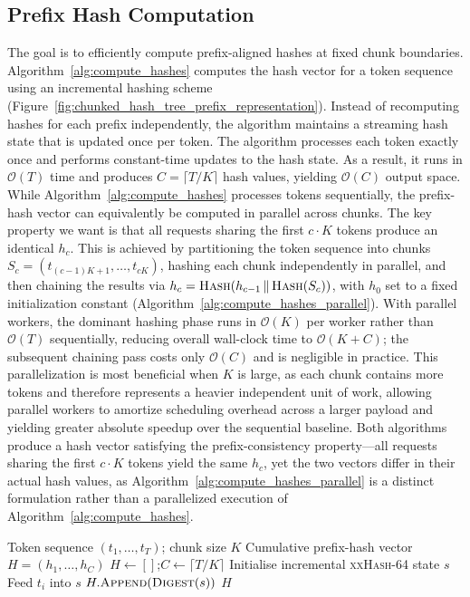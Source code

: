 \subsection{Prefix Hash Computation}
\label{subsec:chunked_hash_tree_prefix_representation}
The goal is to efficiently compute prefix-aligned hashes at fixed chunk boundaries. Algorithm~\ref{alg:compute_hashes} computes the hash vector for a token sequence using an incremental hashing scheme (Figure~\ref{fig:chunked_hash_tree_prefix_representation}). Instead of recomputing hashes for each prefix independently, the algorithm maintains a streaming hash state that is updated once per token. The algorithm processes each token exactly once and performs constant-time updates to the hash state. As a result, it runs in $\mathcal{O}(T)$ time and produces $C = \lceil T / K \rceil$ hash values, yielding $\mathcal{O}(C)$ output space. While Algorithm~\ref{alg:compute_hashes} processes tokens sequentially, the prefix-hash vector can equivalently be computed in parallel across chunks. The key property we want is that all requests sharing the first $c \cdot K$ tokens produce an identical $h_c$. This is achieved by partitioning the token sequence into chunks $S_c = (t_{(c-1)K+1}, \dots, t_{cK})$, hashing each chunk independently in parallel, and then chaining the results via $h_c = \textsc{Hash}(h_{c-1} \,\|\, \textsc{Hash}(S_c))$, with $h_0$ set to a fixed initialization constant (Algorithm~\ref{alg:compute_hashes_parallel}). With parallel workers, the dominant hashing phase runs in $\mathcal{O}(K)$ per worker rather than $\mathcal{O}(T)$ sequentially, reducing overall wall-clock time to $\mathcal{O}(K + C)$; the subsequent chaining pass costs only $\mathcal{O}(C)$ and is negligible in practice. This parallelization is most beneficial when $K$ is large, as each chunk contains more tokens and therefore represents a heavier independent unit of work, allowing parallel workers to amortize scheduling overhead across a larger payload and yielding greater absolute speedup over the sequential baseline. Both algorithms produce a hash vector satisfying the prefix-consistency property---all requests sharing the first $c \cdot K$ tokens yield the same $h_c$, yet the two vectors differ in their actual hash values, as Algorithm~\ref{alg:compute_hashes_parallel} is a distinct formulation rather than a parallelized execution of Algorithm~\ref{alg:compute_hashes}.

\begin{algorithm}[b]
\caption{\textsc{ComputeHashes}(S, K)}
\label{alg:compute_hashes}
\begin{algorithmic}[1]
\Require Token sequence $(t_1, \dots, t_T)$; chunk size $K$
\Ensure Cumulative prefix-hash vector $H = (h_1, \dots, h_C)$
\State $H \gets []$;\quad $C \gets \lceil T / K \rceil$
\State Initialise incremental \textsc{xxHash-64} state $s$
  \State Feed $t_i$ into $s$
    \State $H.\textsc{Append}(\textsc{Digest}(s))$
  \EndIf
\EndFor
\State \Return $H$
\end{algorithmic}
\end{algorithm}

